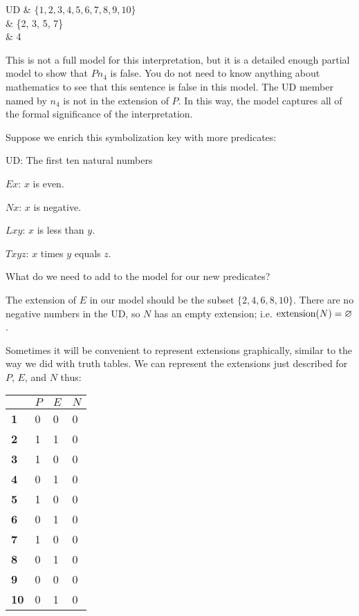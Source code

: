 \begin{partialmodel}
	UD & $\{1, 2, 3, 4, 5, 6, 7, 8, 9, 10\}$\\
	 & \{2, 3, 5, 7\}\\
	 & 4
\end{partialmodel}

This is not a full model for this interpretation, but it is a detailed enough partial model to show that $Pn_{4}$ is false. You do not need to know anything about mathematics to see that this sentence is false in this model. The UD member named by $n_{4}$ is not in the extension of $P$. In this way, the model captures all of the formal significance of the interpretation.

Suppose we enrich this symbolization key with more predicates:
\label{10UD}
\begin{ekey}
\item{UD:} The first ten natural numbers
\item{$Ex$:} $x$ is even.
\item{$Nx$:} $x$ is negative.
\item{$Lxy$:} $x$ is less than $y$.
\item{$Txyz$:} $x$ times $y$ equals $z$.
\end{ekey}
What do we need to add to the model for our new predicates?

The extension of $E$ in our model should be the subset $\{2, 4, 6, 8, 10\}$. There are no negative numbers in the UD, so $N$ has an empty extension; i.e. $\mbox{extension}(N)=\varnothing$.

Sometimes it will be convenient to represent extensions graphically, similar to the way we did with truth tables. We can represent the extensions just described for $P$, $E$, and $N$ thus:

\begin{table}[h!]
\centering
\begin{tabular}{l|l|l|l}
            & $P$ & $E$ & $N$ \\ \hline
\textbf{1}  & 0  & 0          & 0          \\
\textbf{2}  & 1  & 1          & 0          \\
\textbf{3}  & 1  & 0          & 0          \\
\textbf{4}  & 0  & 1          & 0          \\
\textbf{5}  & 1  & 0          & 0          \\
\textbf{6}  & 0  & 1          & 0          \\
\textbf{7}  & 1  & 0          & 0          \\
\textbf{8}  & 0  & 1          & 0          \\
\textbf{9}  & 0  & 0          & 0          \\
\textbf{10} & 0 & 1          & 0         
\end{tabular}
\end{table}

